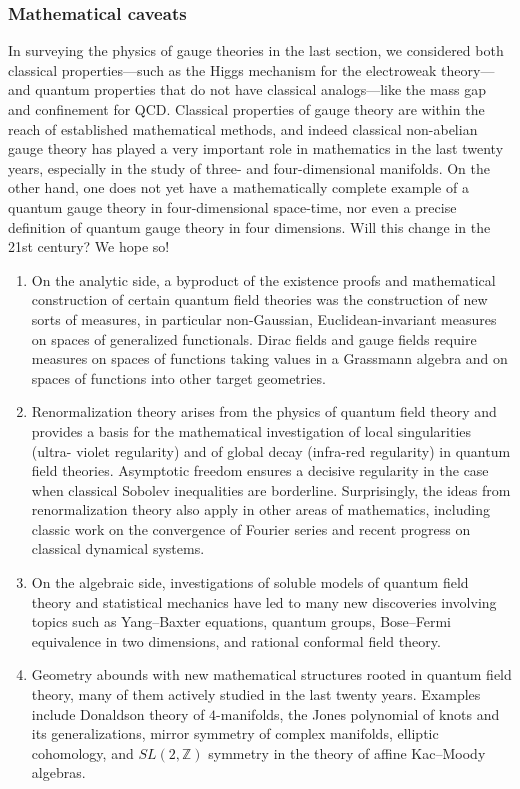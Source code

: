  \subsubsection{Mathematical caveats}
 In surveying the physics of gauge theories in the last section, we considered both
 classical properties—such as the Higgs mechanism for the electroweak theory—
 and quantum properties that do not have classical analogs—like the mass gap and
 confinement for QCD. Classical properties of gauge theory are within the reach of
 established mathematical methods, and indeed classical non-abelian gauge theory
 has played a very important role in mathematics in the last twenty years, especially
 in the study of three- and four-dimensional manifolds. On the other hand, one does
 not yet have a mathematically complete example of a quantum gauge theory in
 four-dimensional space-time, nor even a precise definition of quantum gauge theory
 in four dimensions. Will this change in the 21st century? We hope so!\\
 \begin{enumerate}
 	\item  On the analytic side, a byproduct of the existence proofs and mathematical
 	construction of certain quantum field theories was the construction of new sorts of
 	measures, in particular non-Gaussian, Euclidean-invariant measures on spaces of
 	generalized functionals. Dirac fields and gauge fields require measures on spaces
 	of functions taking values in a Grassmann algebra and on spaces of functions into
 	other target geometries.
 	\item 	Renormalization theory arises from the physics of quantum field theory and
 	provides a basis for the mathematical investigation of local singularities (ultra-
 	violet regularity) and of global decay (infra-red regularity) in quantum field theories.
 	Asymptotic freedom ensures a decisive regularity in the case when classical Sobolev
 	inequalities are borderline. Surprisingly, the ideas from renormalization theory also
 	apply in other areas of mathematics, including classic work on the convergence of
 	Fourier series and recent progress on classical dynamical systems.
 	\item On the algebraic side, investigations of soluble models of quantum field theory
 	and statistical mechanics have led to many new discoveries involving topics such
 	as Yang–Baxter equations, quantum groups, Bose–Fermi equivalence in two dimensions, and rational conformal field theory.
 \item	Geometry abounds with new mathematical structures rooted in quantum field
 	theory, many of them actively studied in the last twenty years. Examples include
 	Donaldson theory of $4$-manifolds, the Jones polynomial of knots and its generalizations, mirror symmetry of complex manifolds, elliptic cohomology, and $SL(2, \mathbb{Z})$
 	symmetry in the theory of affine Kac–Moody algebras.
 \end{enumerate}

